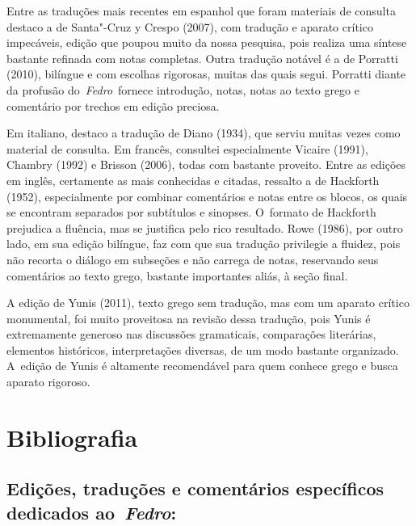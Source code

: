 {Entre as traduções mais recentes em espanhol que foram materiais de
consulta destaco a de Santa"-Cruz y Crespo (2007), com tradução e aparato
crítico impecáveis, edição que poupou muito da nossa pesquisa, pois
realiza uma síntese bastante refinada com notas completas. Outra
tradução notável é a de Porratti (2010), bilíngue e com escolhas
rigorosas, muitas das quais segui. Porratti diante da profusão
do~\emph{Fedro}~fornece introdução, notas, notas ao texto grego e
comentário por trechos em edição preciosa.

Em italiano, destaco a tradução de Diano (1934), que serviu muitas vezes
como material de consulta. Em francês, consultei especialmente Vicaire
(1991), Chambry (1992) e Brisson (2006), todas com bastante proveito.
Entre as edições em inglês, certamente as mais conhecidas e citadas,
ressalto a de Hackforth (1952), especialmente por combinar comentários e
notas entre os blocos, os quais se encontram separados por subtítulos e
sinopses. O~formato de Hackforth prejudica a fluência, mas se justifica
pelo rico resultado. Rowe (1986), por outro lado, em sua edição bilíngue,
faz com que sua tradução privilegie a fluidez, pois não recorta o
diálogo em subseções e não carrega de notas, reservando seus comentários
ao texto grego, bastante importantes aliás, à seção final.

A edição de Yunis (2011), texto grego sem tradução, mas com um aparato
crítico monumental, foi muito proveitosa na revisão dessa tradução, pois
Yunis é extremamente generoso nas discussões gramaticais, comparações
literárias, elementos históricos, interpretações diversas, de um modo
bastante organizado. A~edição de Yunis é altamente recomendável para
quem conhece grego e busca aparato rigoroso.

 

\section{Bibliografia}

\subsection{Edições, traduções e comentários específicos dedicados
ao~\emph{Fedro}:}

 

}
